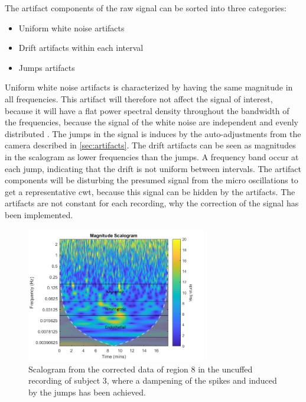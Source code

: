 The artifact components of the raw signal can be sorted into three categories: 
\begin{itemize}
	\item Uniform white noise artifacts
    \item Drift artifacts within each interval
	\item Jumps artifacts
\end{itemize}

Uniform white noise artifacts is characterized by having the same magnitude in all frequencies. This artifact will therefore not affect the signal of interest, because it will have a flat power spectral density throughout the bandwidth of the frequencies, because the signal of the white noise are independent and evenly distributed \cite{hida2014}. 
The jumps in the signal is induces by the auto-adjustments from the camera described in \ref{sec:artifacts}. The drift artifacts can be seen as magnitudes in the scalogram as lower frequencies than the jumps. A frequency band occur at each jump, indicating that the drift is not uniform between intervals.
The artifact components will be disturbing the presumed signal from the micro oscillations to get a representative cwt, because this signal can be hidden by the artifacts. The artifacts are not constant for each recording, why the correction of the signal has been implemented.

\begin{figure}[H]
	\includegraphics[width=0.7\textwidth]{figures/uncuffed_sub3_roi8_corr}
	\caption{Scalogram from the corrected data of region 8 in the uncuffed recording of subject 3, where a dampening of the spikes and  induced by the jumps has been achieved.}
	\label{fig:scalogram_corr}
\end{figure} 

